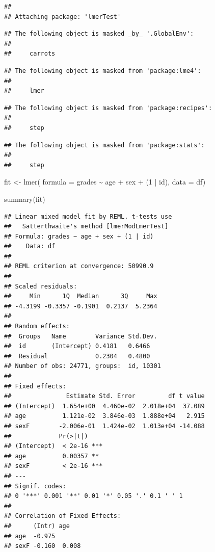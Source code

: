 \documentclass[
]{book}
\newenvironment{Shaded}{\begin{snugshade}}{\end{snugshade}}
\newcommand{\AttributeTok}[1]{\textcolor[rgb]{0.77,0.63,0.00}{#1}}
\newcommand{\DecValTok}[1]{\textcolor[rgb]{0.00,0.00,0.81}{#1}}
\newcommand{\FunctionTok}[1]{\textcolor[rgb]{0.00,0.00,0.00}{#1}}
\newcommand{\NormalTok}[1]{#1}
\newcommand{\OtherTok}[1]{\textcolor[rgb]{0.56,0.35,0.01}{#1}}
\newcommand{\SpecialCharTok}[1]{\textcolor[rgb]{0.00,0.00,0.00}{#1}}
\begin{document}
\begin{verbatim}
## 
## Attaching package: 'lmerTest'
\end{verbatim}

\begin{verbatim}
## The following object is masked _by_ '.GlobalEnv':
## 
##     carrots
\end{verbatim}

\begin{verbatim}
## The following object is masked from 'package:lme4':
## 
##     lmer
\end{verbatim}

\begin{verbatim}
## The following object is masked from 'package:recipes':
## 
##     step
\end{verbatim}

\begin{verbatim}
## The following object is masked from 'package:stats':
## 
##     step
\end{verbatim}

\begin{Shaded}
\begin{Highlighting}[]
\NormalTok{fit }\OtherTok{\textless{}{-}} \FunctionTok{lmer}\NormalTok{(}
  \AttributeTok{formula =}\NormalTok{ grades }\SpecialCharTok{\textasciitilde{}}\NormalTok{ age }\SpecialCharTok{+}\NormalTok{ sex }\SpecialCharTok{+}\NormalTok{ (}\DecValTok{1} \SpecialCharTok{|}\NormalTok{ id),}
  \AttributeTok{data =}\NormalTok{ df)}

\FunctionTok{summary}\NormalTok{(fit)}
\end{Highlighting}
\end{Shaded}

\begin{verbatim}
## Linear mixed model fit by REML. t-tests use
##   Satterthwaite's method [lmerModLmerTest]
## Formula: grades ~ age + sex + (1 | id)
##    Data: df
## 
## REML criterion at convergence: 50990.9
## 
## Scaled residuals: 
##     Min      1Q  Median      3Q     Max 
## -4.3199 -0.3357 -0.1901  0.2137  5.2364 
## 
## Random effects:
##  Groups   Name        Variance Std.Dev.
##  id       (Intercept) 0.4181   0.6466  
##  Residual             0.2304   0.4800  
## Number of obs: 24771, groups:  id, 10301
## 
## Fixed effects:
##               Estimate Std. Error         df t value
## (Intercept)  1.654e+00  4.460e-02  2.018e+04  37.089
## age          1.121e-02  3.846e-03  1.888e+04   2.915
## sexF        -2.006e-01  1.424e-02  1.013e+04 -14.088
##             Pr(>|t|)    
## (Intercept)  < 2e-16 ***
## age          0.00357 ** 
## sexF         < 2e-16 ***
## ---
## Signif. codes:  
## 0 '***' 0.001 '**' 0.01 '*' 0.05 '.' 0.1 ' ' 1
## 
## Correlation of Fixed Effects:
##      (Intr) age   
## age  -0.975       
## sexF -0.160  0.008
\end{verbatim}
\end{document}
